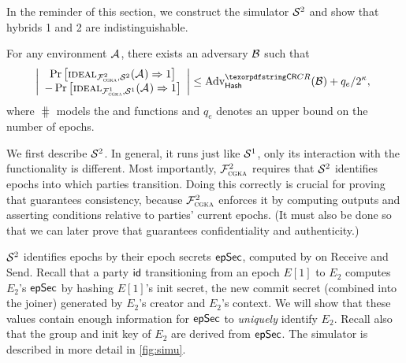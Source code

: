 In the reminder of this section, we construct the simulator $\mathcal{S}_{\textsc{\relax}}^2$ and show that hybrids 1 and 2 are indistinguishable.
\begin{theorem}
  For any environment $\mathcal{A}_{\relax}$, there exists an adversary $\mathcal{B}_{\relax}$ such that
  \begin{equation*}\normalfont
    \left\lvert\begin{array}{c}
    \Pr\left[\ucideal_{\funcCGKA^2, \ucsim^2}(\Adv) \Rightarrow 1\right] \\- \Pr\left[\ucideal_{\funcCGKA^1,
      \ucsim^1}(\Adv) \Rightarrow 1\right]
    \end{array}\right\lvert
    \leq \textnormal{Adv}^{\gamefont{CR}}_{\hash}(\Bdv) + q_e/2^\kappa,
  \end{equation*}
  where $\hash$ models the \hkdfexp and \hkdfext functions and $q_e$ denotes an upper bound on the number of epochs.
\label{thm:itk1}\end{theorem}

We first describe $\mathcal{S}_{\textsc{\relax}}^2$. In general, it runs \saik just like $\mathcal{S}_{\textsc{\relax}}^1$, only its interaction with the functionality is different. Most importantly, $\mathcal{F}_{\normalfont\textsc{cgka}}^2$ requires that $\mathcal{S}_{\textsc{\relax}}^2$ identifies epochs into which parties transition. Doing this correctly is crucial for proving that \saik guarantees consistency, because $\mathcal{F}_{\normalfont\textsc{cgka}}^2$ enforces it by computing outputs and asserting conditions relative to parties' current epochs. (It must also be done so that we can later prove that \saik guarantees confidentiality and authenticity.)

$\mathcal{S}_{\textsc{\relax}}^2$ identifies epochs by their epoch secrets ${\mathsf{epSec}}$, computed by \saik on Receive and Send. Recall that a party ${\mathsf{id}}$ transitioning from an epoch $E[1]$ to $E_2$ computes $E_2$'s ${\mathsf{epSec}}$ by hashing $E[1]$'s init secret, the new commit secret (combined into the joiner) generated by $E_2$'s creator and $E_2$'s context. We will show that these values contain enough information for ${\mathsf{epSec}}$ to \emph{uniquely} identify $E_2$. Recall also that the group and init key of $E_2$ are derived from ${\mathsf{epSec}}$.
The simulator is described in more detail in \cref{fig:simu}.

